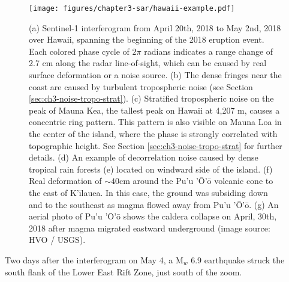 \begin{figure}[!htbp]
	\centering
	\texttt{[image: figures/chapter3-sar/hawaii-example.pdf]}
	\caption[Sentinel-1 interferogram over Hawaii showing common noise sources, along with 2018 eruption deformation]{
		(a) Sentinel-1 interferogram from April 20th, 2018 to May 2nd, 2018 over Hawaii, spanning the beginning of the 2018 eruption event.
		Each colored phase cycle of $2\pi$ radians indicates a range change of 2.7 cm along the radar line-of-sight, which can be caused by real surface deformation or a noise source.
		(b) The dense fringes near the coast are caused by turbulent tropospheric noise (see Section \ref{sec:ch3-noise-tropo-strat}).
		(c) Stratified tropospheric noise on the peak of Mauna Kea, the tallest peak on Hawaii at 4,207 m, causes a concentric ring pattern. This pattern is also visible on Mauna Loa in the center of the island, where the phase is strongly correlated with topographic height. See Section \ref{sec:ch3-noise-tropo-strat} for further details.
		(d) An example of decorrelation noise caused by dense tropical rain forests (e) located on windward side of the island.
		(f) Real deformation of $ \sim 40 $cm around the Pu'u '\=O'\=o volcanic cone to the east of K'\=ilauea. In this case, the ground was subsiding down and to the southeast as magma flowed away from Pu'u '\=O'\=o.
		(g) An aerial photo of Pu'u '\=O'\=o shows the caldera collapse on April, 30th, 2018 after magma migrated eastward underground (image source: HVO / USGS).
	}
	\label{fig:sar-hawaii-example}
\end{figure}

Two days after the interferogram on May 4, a  M$_w$ 6.9 earthquake struck the south flank of the Lower East Rift Zone, just south of the zoom.







